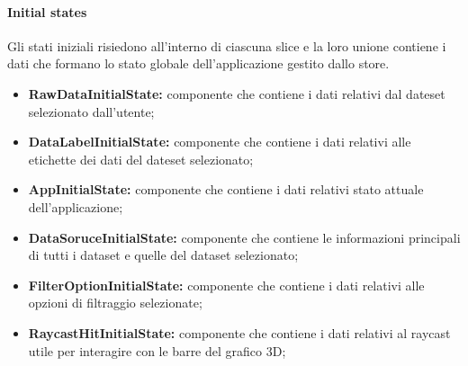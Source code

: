     \paragraph{Initial states}
        Gli stati iniziali risiedono all’interno di ciascuna slice e la loro unione contiene i dati che formano
        lo stato globale dell’applicazione gestito dallo store.
        \begin{itemize}
            \item \textbf{RawDataInitialState:} componente che contiene i dati relativi dal dateset selezionato dall'utente;
            \item \textbf{DataLabelInitialState:} componente che contiene i dati relativi alle etichette dei dati del dateset selezionato;
            \item \textbf{AppInitialState:} componente che contiene i dati relativi stato attuale dell'applicazione;
            \item \textbf{DataSoruceInitialState:} componente che contiene le informazioni principali di tutti i dataset e quelle del dataset selezionato;
            \item \textbf{FilterOptionInitialState:} componente che contiene i dati relativi alle opzioni di filtraggio selezionate;
            \item \textbf{RaycastHitInitialState:} componente che contiene i dati relativi al raycast utile per interagire con le barre del grafico 3D;
        \end{itemize}
